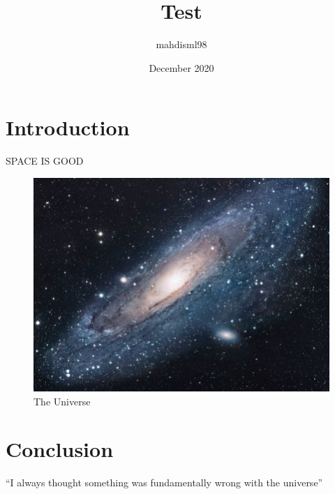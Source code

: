 \documentclass{article}
\title{Test}
\author{mahdisml98 }
\date{December 2020}
\begin{document}
\maketitle

\section{Introduction}
SPACE IS GOOD

\begin{figure}[h!]
\centering
\includegraphics[scale=1.7]{universe}
\caption{The Universe}
\label{fig:universe}
\end{figure}

\section{Conclusion}
``I always thought something was fundamentally wrong with the universe'' \citep{adams1995hitchhiker}



\end{document}
